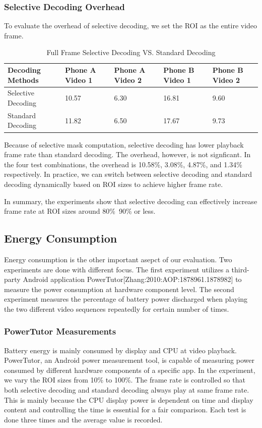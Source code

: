 \subsubsection{Selective Decoding Overhead}
To evaluate the overhead of selective decoding, we set the ROI as the entire video frame. 
\begin{table}
\caption{Full Frame Selective Decoding VS. Standard Decoding}
\centering
\begin{center}
\begin{tabular}{|p{1.5cm}|p{1.5cm}|p{1.5cm}|p{1.5cm}|p{1.5cm}|}
\hline
Decoding Methods & Phone A Video 1 & Phone A Video 2 & Phone B Video 1 & Phone B Video 2 \\
\hline
Selective Decoding  &  10.57  &   6.30  &  16.81  &  9.60\\
Standard Decoding   &  11.82  &   6.50  &  17.67  &  9.73 \\
\hline
\end{tabular}
\end{center}
\end{table}

Because of selective mask computation, selective decoding has lower playback frame rate than standard decoding. The overhead, however, is not signficant. In the four test combinations, the overhead is 10.58\%, 3.08\%, 4.87\%, and 1.34\% respectively. In practice, we can switch between selective decoding and standard decoding dynamically based on ROI sizes to achieve higher frame rate. 

In summary, the experiments show that selective decoding can effectively increase frame rate at ROI sizes around 80\%~90\% or less. 
 
\subsection{Energy Consumption} 
Energy consumption is the other important asepct of our evaluation. Two experiments are done with different focus. The first experiment utilizes a third-party Android application PowerTutor[Zhang:2010:AOP:1878961.1878982] to measure the power consumption at hardware component level. The second experiment measures the percentage of battery power discharged when playing the two different video sequences repeatedly for certain number of times. 

\subsubsection{PowerTutor Measurements}
Battery energy is mainly consumed by display and CPU at video playback. PowerTutor, an Android power measurement tool, is capable of measuring power consumed by different hardware components of a specific app. In the experiment, we vary the ROI sizes from 10\% to 100\%. The frame rate is controlled so that both selective decoding and standard decoding always play at same frame rate. This is mainly because the CPU display power is dependent on time and display content and controlling the time is essential for a fair comparison. Each test is done three times and the average value is recorded. 

